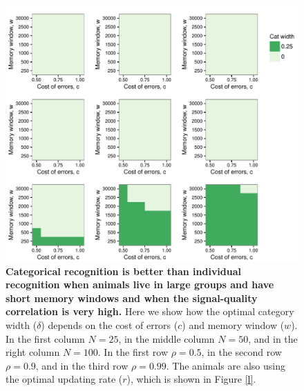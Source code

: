 \begin{figure}
\includegraphics[width=6.85in]{figures/delta_heat_maps.pdf}
\caption{\sffamily\small\textbf{Categorical recognition is better than individual recognition when animals live in large groups and have short memory windows and when the signal-quality correlation is very high.} Here we show how the optimal category width ($\delta$) depends on the cost of errors ($c$) and memory window ($w$). In the first column $N=25$, in the middle column $N=50$, and in the right column $N=100$. In the first row $\rho=0.5$, in the second row $\rho=0.9$, and in the third row $\rho=0.99$. The animals are also using the optimal updating rate ($r$), which is shown in Figure \ref{l}.}
\label{delta}
\end{figure}

